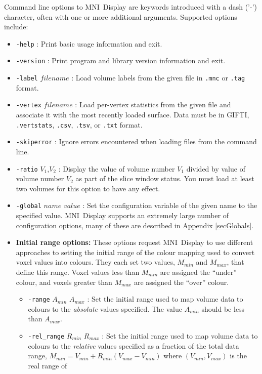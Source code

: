 \documentclass[11pt,letterpaper]{article}
\newcommand{\ident}[1]{{\tt #1}}
\newcommand{\display}{\mbox{MNI Display}}
\begin{document}
Command line options to \display{} are keywords introduced with a dash
('-') character, often with one or more additional arguments. Supported
options include:

\begin{itemize}
\item \ident{-help} : Print basic usage information and exit.
\item \ident{-version} : Print program and library version information and exit.
\item \ident{-label} $filename$ : Load volume labels from the given file in \ident{.mnc} or \ident{.tag} format.
\item \ident{-vertex} $filename$ : Load per-vertex statistics from the
  given file and associate it with the most recently loaded
  surface. Data must be in GIFTI, \ident{.vertstats}, \ident{.csv},
  \ident{.tsv}, or \ident{.txt} format.
\item \ident{-skiperror} : Ignore errors encountered when loading files from the command line.
\item \ident{-ratio} $V_1$,$V_2$ : Display the value of volume number $V_1$
  divided by value of volume number $V_2$ as part of the slice window status. You must load at least two
  volumes for this option to have any effect.
\item \ident{-global} $name$ $value$ : Set the configuration variable of the given name to the specified value. \display{} supports an extremely large number of configuration options, many of these are described in Appendix \ref{secGlobals}.
\item {\bf Initial range options:} These options request \display{} to
  use different approaches to setting the initial range of the colour
  mapping used to convert voxel values into colours. They each set two
  values, $M_{min}$ and $M_{max}$, that define this range. Voxel values
  less than $M_{min}$ are assigned the ``under'' colour, and voxels
  greater than $M_{max}$ are assigned the ``over'' colour.
\begin{itemize}
\item \ident{-range} $A_{min}$ $A_{max}$ : Set the initial range used to
  map volume data to colours to the {\em absolute} values specified. The
  value $A_{min}$ should be less than $A_{max}$.
\item \ident{-rel\_range} $R_{min}$ $R_{max}$ : Set the initial range used to
  map volume data to colours to the {\em relative} values specified as a
  fraction of the total data range, $M_{min} = V_{min} + R_{min}
  (V_{max} - V_{min})$ where $(V_{min},V_{max})$ is the real range of

\end{itemize}
\end{itemize}
\end{document}
